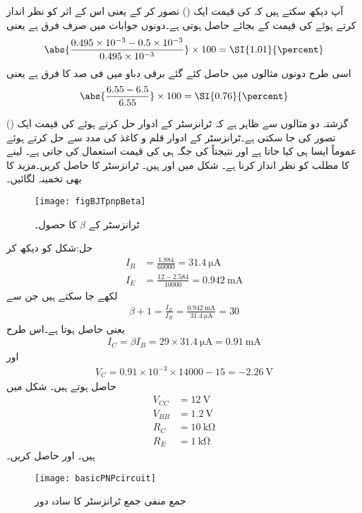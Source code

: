 آپ دیکھ سکتے ہیں کہ   کی قیمت ایک () تصور کر کے یعنی اس کے اثر کو نظر انداز کرتے ہوئے  کی قیمت   کے بجائے  حاصل ہوتی ہے۔دونوں جوابات میں صرف   فرق ہے یعنی
\begin{align*}
\abs{\frac{0.495 \times 10^{-3} -0.5 \times 10^{-3}}{0.495 \times 10^{-3}}} \times 100 = \SI{1.01}{\percent}
\end{align*}
اسی طرح دونوں مثالوں میں حاصل کئے گئے برقی دباو   میں   فی صد کا فرق ہے یعنی
\begin{align*}
\abs{\frac{6.55-6.5}{6.55}} \times 100 = \SI{0.76}{\percent}
\end{align*}

گزشتہ دو مثالوں سے ظاہر ہے کہ ٹرانزسٹر کے ادوار حل کرتے ہوئے  کی قیمت ایک () تصور کی جا سکتی ہے۔ٹرانزسٹر کے ادوار قلم و کاغذ کی مدد سے حل کرتے ہوئے عموماً ایسا ہی کیا جاتا ہے اور نتیجتاً  کی جگہ  ہی کی قیمت استعمال کی جاتی ہے۔ لینے کا مطلب  کو نظر انداز کرنا ہے۔
شکل  میں  اور  ہیں۔ ٹرانزسٹر کا  حاصل کریں۔مزید  کا بھی تخمینہ لگائیں۔
\begin{figure}
\centering
\texttt{[image: figBJTpnpBeta]}
\caption{ٹرانزسٹر کے $\beta$ کا حصول۔}
\label{شکل_ٹرانزسٹر_بیٹا_حصول}
\end{figure}
%

حل:شکل کو دیکھ کر
\begin{align*}
I_B&=\frac{1.884}{60000}=\SI{31.4}{\micro \ampere}\\
I_E&=\frac{12-2.584}{10000}=\SI{0.942}{\milli \ampere}
\end{align*}
لکھے جا سکتے ہیں جن سے
\begin{align*}
\beta+1=\frac{I_E}{I_B}=\frac{\SI{0.942}{\milli \ampere}}{\SI{31.4}{\micro \ampere}}=30
\end{align*}
یعنی  حاصل ہوتا ہے۔اس طرح
\begin{align*}
I_C=\beta I_B=29 \times \SI{31.4}{\micro \ampere}=\SI{0.91}{\milli \ampere}
\end{align*}
اور
\begin{align*}
V_C=0.91 \times 10^{-3} \times 14000-15=\SI{-2.26}{\volt}
\end{align*}
حاصل ہوتے ہیں۔
شکل  میں
\begin{align*}
V_{CC}&=\SI{12}{\volt} \\
V_{BB}&=\SI{1.2}{\volt} \\
R_C& = \SI{10}{\kilo \ohm}\\
R_E&=\SI{1}{\kilo \ohm}
\end{align*}
ہیں۔ اور  حاصل کریں۔
\begin{figure}
\centering
\texttt{[image: basicPNPcircuit]}
\caption{جمع منفی جمع ٹرانزسٹر کا سادہ دور}
\label{شکل_ٹرانزسٹر__جمع_منفی_جمع_سادہ_دور}
\end{figure}

